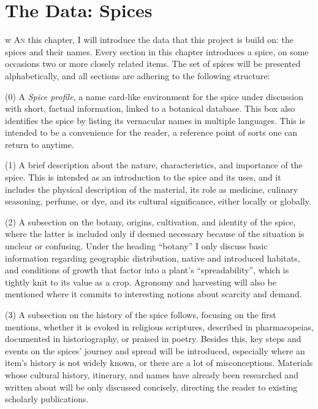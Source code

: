 \chapter{The Data: Spices}
\label{ch:data}
w
\lettrine[lines=\iniciale]{\textcolor{\accentcolor}{A}}{n} this chapter, I will  introduce the data that this project is build on: the spices and their names. Every section in this chapter introduces a spice, on some occasions two or more closely related items. The set of spices will be presented alphabetically, and all sections are adhering to the following structure: 

(0) A \textit{Spice profile}, a name card-like environment for the spice under discussion with short, factual information, linked to a botanical database. This box also identifies the spice by listing its vernacular names in multiple languages. This is intended to be a convenience for the reader, a reference point of sorts one can return to anytime.

(1) A brief description about the nature, characteristics, and importance of the spice. This is intended as an introduction to the spice and its uses, and it includes the physical description of the material, its role as medicine, culinary seasoning, perfume, or dye, and its cultural significance, either locally or globally. 

(2) A subsection on the botany, origins, cultivation, and identity of the spice, where the latter is included only if deemed necessary because of the situation is unclear or confusing. Under the heading ``botany'' I only discuss basic information regarding geographic distribution, native and introduced habitats, and conditions of growth that factor into a plant's ``spreadability'', which is tightly knit to its value as a crop. Agronomy and harvesting will also be mentioned where it commits to interesting notions about scarcity and demand.

(3) A subsection on the history of the spice follows, focusing on the first mentions, whether it is evoked in religious scriptures, described in pharmacopeias, documented in historiography, or praised in poetry. Besides this, key steps and events on the spices' journey and spread will be introduced, especially where an item's history is not widely known, or there are a lot of misconceptions. Materials whose cultural history, itinerary, and names have already been researched and written about will be only discussed concisely, directing the reader to existing scholarly publications. 

